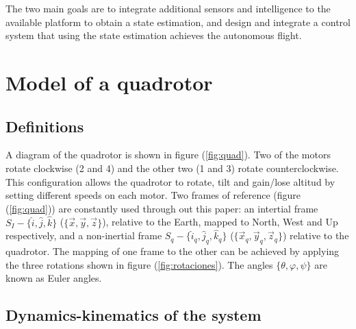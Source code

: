 \documentclass[conference]{IEEEtran}
\newcommand{\refp}[1]{(\ref{#1})}
\begin{document}

 
The two main goals are to integrate additional sensors and intelligence to the available platform to obtain a state estimation, and design and integrate a control system that using the state estimation achieves the autonomous flight.
\section{Model of a quadrotor}
\label{sec:modelo}

\subsection{Definitions}
\label{sec:modelo-defs}

A diagram of the quadrotor is shown in figure \refp{fig:quad}. Two of the motors rotate clockwise (2 and 4) and the other two (1 and 3) rotate counterclockwise. This configuration allows the quadrotor to rotate, tilt and gain/lose altitud by setting different speeds on each motor. Two frames of reference (figure \refp{fig:quad}) are constantly used through out this paper: an intertial frame $S_I - \lbrace \hat{i},\hat{j},\hat{k}\rbrace$ ($\lbrace \vec{x},\vec{y},\vec{z}\rbrace$), relative to the Earth, mapped to  North, West and Up respectively, and a non-inertial frame $S_q - \lbrace \hat{i}_q,\hat{j}_q,\hat{k}_q\rbrace$ ($\lbrace \vec{x}_q,\vec{y}_q,\vec{z}_q\rbrace$) relative to the quadrotor. The mapping of one frame to the other can be achieved by applying the three rotations shown in figure \refp{fig:rotaciones}. The angles $\lbrace \theta, \varphi, \psi\rbrace$ are known as Euler angles.

\subsection{Dynamics-kinematics of the system}
\label{sec:modelo-dyn-kin}
\end{document}
